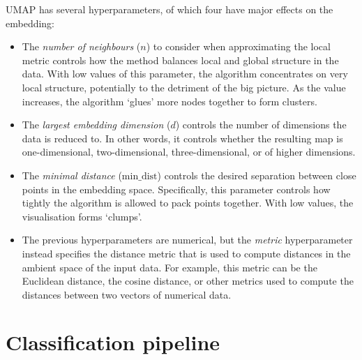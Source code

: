 UMAP has several hyperparameters, of which four have major effects on the embedding:
\begin{itemize}
  \item The \emph{number of neighbours} ($n$) to consider when approximating the local metric controls how the method balances local and global structure in the data.
        With low values of this parameter, the algorithm concentrates on very local structure, potentially to the detriment of the big picture.
        As the value increases, the algorithm `glues' more nodes together to form clusters.
  \item The \emph{largest embedding dimension} ($d$) controls the number of dimensions the data is reduced to.
        In other words, it controls whether the resulting map is one-dimensional, two-dimensional, three-dimensional, or of higher dimensions.
  \item The \emph{minimal distance} ($\mathrm{min\_dist}$) controls the desired separation between close points in the embedding space.
        Specifically, this parameter controls how tightly the algorithm is allowed to pack points together.
        With low values, the visualisation forms `clumps'.
  \item The previous hyperparameters are numerical, but the \emph{metric} hyperparameter instead specifies the distance metric that is used to compute distances in the ambient space of the input data.
        For example, this metric can be the Euclidean distance, the cosine distance, or other metrics used to compute the distances between two vectors of numerical data.
\end{itemize}



\section{Classification pipeline}
\label{append:analysis-ml}


